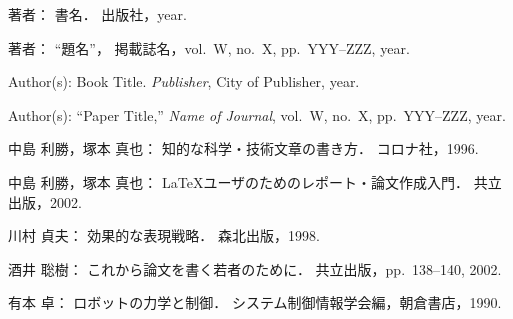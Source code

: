 
\begin{thebibliography}{9}				%

		著者：
			書名．
				出版社，year.

		著者：
			``題名''，
				掲載誌名，vol.~W, no.~X, pp.~YYY--ZZZ, year.

		Author(s):
			Book Title.
				{\it Publisher}, City of Publisher, year.

		Author(s):
			``Paper Title,''
				{\it Name of Journal}, vol.~W, no.~X, pp.~YYY--ZZZ, year.

	 中島 利勝，塚本 真也：
		知的な科学・技術文章の書き方．
			コロナ社，1996.

	 中島 利勝，塚本 真也：
		\LaTeX ユーザのためのレポート・論文作成入門．
			共立出版，2002.

	 川村 貞夫：
		効果的な表現戦略．
			森北出版，1998.

	 酒井 聡樹：
		これから論文を書く若者のために．
			共立出版，pp.~138--140, 2002.

	 有本 卓：
		ロボットの力学と制御．
			システム制御情報学会編，朝倉書店，1990.

\end{thebibliography}

